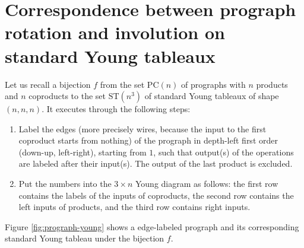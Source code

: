 \newcommand{\coproduct}{\tikz[baseline=-0.5ex] \node[bcircle] {};}
\newcommand{\product}{\tikz[baseline=-0.5ex] \node[bsquare] {};}

\section{Correspondence between prograph rotation and involution on standard Young tableaux}

Let us recall a bijection $f$ from the set $\text{PC}(n)$ of prographs with $n$ products and $n$ coproducts to the set $\text{ST}(n^3)$ of standard Young tableaux of shape $(n,n,n)$. \cite{borie2017three} It executes through the following steps:
\begin{enumerate}
  \item Label the edges (more precisely wires, because the input to the first coproduct starts from nothing) of the prograph in depth-left first order (down-up, left-right), starting from $1$, such that output(s) of the operations are labeled after their input(s). The output of the last product is excluded.
  \item Put the numbers into the $3\times n$ Young diagram as follows: the first row contains the labels of the inputs of coproducts, the second row contains the left inputs of products, and the third row contains right inputs.
\end{enumerate}

\begin{example}
  Figure \ref{fig:prograph-young} shows a edge-labeled prograph and its corresponding standard Young tableau under the bijection $f$.
\end{example}

